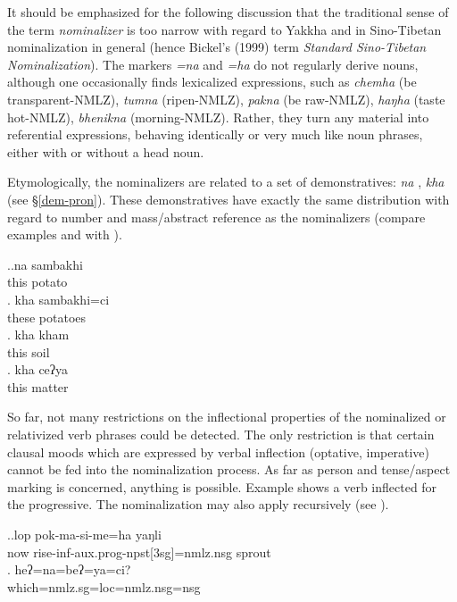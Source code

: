 It should be emphasized for the following discussion that the traditional sense of the term \emph{nominalizer} is too narrow with regard to Yakkha and in Sino-Tibetan nominalization in general (hence Bickel's (1999) term \emph{Standard Sino-Tibetan Nominalization}).  The markers \emph{=na} and \emph{=ha} do not regularly derive nouns, although one occasionally finds lexicalized expressions, such as \emph{chemha}  (be transparent-NMLZ),  \emph{tumna}  (ripen-NMLZ), \emph{pakna}  (be raw-NMLZ), \emph{haŋha}  (taste hot-NMLZ), \emph{bhenikna}  (morning-NMLZ). Rather, they  turn any material into referential expressions, behaving identically or very much like noun phrases, either with or without a head noun. 


Etymologically, the nominalizers are related to a set of demonstratives: \emph{na} , \emph{kha}  (see §\ref{dem-pron}). These demonstratives have exactly the same distribution with regard to number and mass/abstract reference as the nominalizers (compare examples \LLast and \Last with \Next).


\ex.\ag.na sambakhi\\
this potato\\
\bg. kha sambakhi=ci\\
these potatoes\\
\bg. kha kham\\
this soil\\
\bg. kha ceʔya\\
this matter\\


		 
So far, not many restrictions on the inflectional properties of the nominalized or relativized verb phrases could be detected. The only restriction is that certain clausal moods which are expressed by verbal inflection (optative, imperative) cannot be fed into the nominalization process. As far as person and tense/aspect marking is concerned, anything is possible. Example \Next[a] shows a verb inflected for the progressive. The nominalization may also apply recursively (see \Next[b]).


 \ex.\ag.lop pok-ma-si-me=ha yaŋli\\
 now rise-{\sc inf-aux.prog-npst[3sg]=nmlz.nsg} sprout\\
\bg.  	heʔ=na=beʔ=ya=ci?\\
		which{\sc =nmlz.sg=loc=nmlz.nsg=nsg}\\

